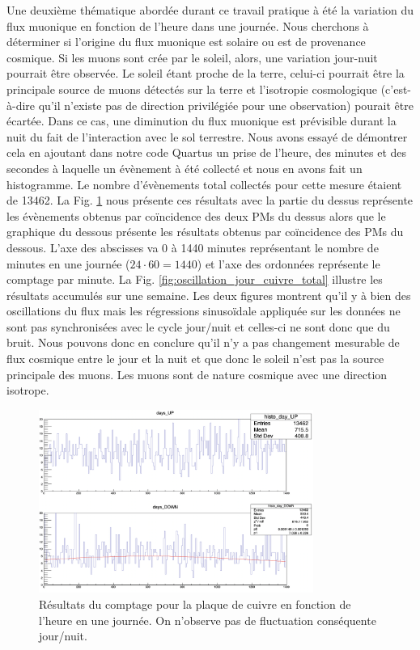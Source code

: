 \documentclass[12pt]{article}
\begin{document}
Une deuxième thématique abordée durant ce travail pratique à été la variation du flux muonique en fonction de l'heure dans une journée. Nous cherchons à déterminer si l'origine du flux muonique est solaire ou est de provenance cosmique. Si les muons sont crée par le soleil, alors, une variation jour-nuit pourrait être observée. 
Le soleil étant proche de la terre, celui-ci pourrait être la principale source de muons détectés sur la terre et l'isotropie cosmologique (c'est-à-dire qu'il n'existe pas de direction privilégiée pour une observation) pourait être écartée. Dans ce cas, une diminution du flux muonique est prévisible durant la nuit du fait de l'interaction avec le sol terrestre. Nous avons essayé de démontrer cela en ajoutant dans notre code Quartus un prise de l'heure, des minutes et des secondes à laquelle un évènement à été collecté et nous en avons fait un histogramme. Le nombre d'évènements total collectés pour cette mesure étaient de 13462. La Fig. \ref{fig:oscillation_jour_cuivre} nous présente ces résultats avec la partie du dessus représente les évènements obtenus par coïncidence des deux PMs du dessus alors que le graphique du dessous présente les résultats obtenus par coïncidence des PMs du dessous. L'axe des abscisses va 0 à 1440 minutes représentant le nombre de minutes en une journée ($24\cdot60=1440$) et l'axe des ordonnées représente le comptage par minute. La Fig. \ref{fig:oscillation_jour_cuivre_total} illustre les résultats accumulés sur une semaine. Les deux figures montrent qu'il y à bien des oscillations du flux mais les régressions sinusoïdale appliquée sur les données ne sont pas synchronisées avec le cycle jour/nuit et celles-ci ne sont donc que du bruit. Nous pouvons donc en conclure qu'il n'y a pas changement mesurable de flux cosmique entre le jour et la nuit et que donc le soleil n'est pas la source principale des muons. Les muons sont de nature cosmique avec une direction isotrope.

\begin{figure}[htpb!]
    \centering
    \includegraphics[width=0.8\textwidth]{graphiques/experience1/cuivre/OSCILLATION_JOUR_CUIVRE.png}
    \caption{Résultats du comptage pour la plaque de cuivre en fonction de l'heure en une journée. On n'observe pas de fluctuation conséquente jour/nuit.}
    \label{fig:oscillation_jour_cuivre}
\end{figure}
\end{document}
